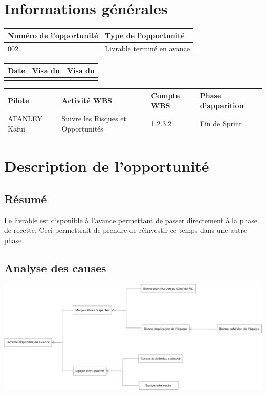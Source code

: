 \section*{Informations générales}
 
\begin{table}[H]
\centering
	\begin{tabularx}{16.8cm}{|X|X|}
	\hline
	 Numéro de l'opportunité & Type de l'opportunité \\
	\hline
	 002 & Livrable terminé en avance  \\
	\hline
	\end{tabularx}
\end{table}

\begin{table}[H]
\centering
	\begin{tabularx}{16.8cm}{|X|X|X|}
	\hline
	Date & Visa du \RQ & Visa du \CP \\
	\hline
	  & & \\
	\hline
	\end{tabularx}
\end{table}

\begin{table}[H]
\centering
	\begin{tabularx}{16.8cm}{|X|X|X|X|}
	\hline
	 Pilote & Activité WBS & Compte WBS & Phase d'apparition \\
	\hline
	 ATANLEY Kafui & Suivre les Risques et Opportunités & 1.2.3.2 & Fin de Sprint \\
	\hline
	\end{tabularx}
\end{table}

\section*{Description de l'opportunité}

\subsection*{Résumé}
	Le livrable est disponible à l'avance permettant de passer directement à la phase de recette. Ceci permettrait de prendre  de réinvestir ce temps dans une autre phase.
	
\subsection*{Analyse des causes}
	
	\includegraphics[scale=0.27]{images/AnalyseOpportunite_nPourquoi_FDO002}

